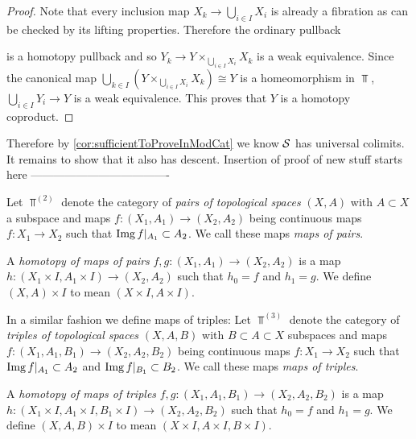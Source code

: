 \begin{lemma}
\begin{proof}
            Note that every inclusion map $X_k\to\bigcup\limits_{i\in I} X_i$ is already a fibration as can be checked by its lifting properties.
            Therefore the ordinary pullback
            \begin{center}
            \end{center}
            is a homotopy pullback and so $Y_k\to Y\times_{\bigcup\limits_{i\in I} X_i}X_k$ is a weak equivalence.
            Since the canonical map $\bigcup\limits_{k\in I}\left(Y\times_{\bigcup\limits_{i\in I} X_i}X_k\right)\cong Y$ is a homeomorphism in $\Top$, $\bigcup\limits_{i\in I}Y_i\to Y$ is a weak equivalence.
            This proves that $Y$ is a homotopy coproduct.
    \end{proof}
\end{lemma}
Therefore by \cref{cor:sufficientToProveInModCat} we know $\mathcal{S}$ has universal colimits.
It remains to show that it also has descent.
Insertion of proof of new stuff starts here -------------------------------------
\begin{definition}
    Let $\Top^{(2)}$ denote the category of \emph{pairs of topological spaces} $(X,A)$ with $A\subset X$ a subspace and maps $f\colon(X_1,A_1)\to (X_2,A_2)$ being continuous maps $f\colon X_1\to X_2$ such that $\operatorname{Img} f|_{A_1}\subset A_2$.
    We call these maps \emph{maps of pairs}.
    
    A \emph{homotopy of maps of pairs} $f,g\colon(X_1,A_1)\to (X_2,A_2)$ is a map $h\colon(X_1\times I,A_1\times I)\to (X_2,A_2)$ such that $h_0=f$ and $h_1=g$.
    We define $(X,A)\times I$ to mean $(X\times I,A\times I)$.

    In a similar fashion we define maps of triples:
    Let $\Top^{(3)}$ denote the category of \emph{triples of topological spaces} $(X,A,B)$ with $B\subset A\subset X$ subspaces and maps $f\colon(X_1,A_1,B_1)\to (X_2,A_2,B_2)$ being continuous maps $f\colon X_1\to X_2$ such that $\operatorname{Img} f|_{A_1}\subset A_2$ and $\operatorname{Img} f|_{B_1}\subset B_2$.
    We call these maps \emph{maps of triples}.
    
    A \emph{homotopy of maps of triples} $f,g\colon(X_1,A_1,B_1)\to (X_2,A_2,B_2)$ is a map $h\colon(X_1\times I,A_1\times I,B_1\times I)\to (X_2,A_2,B_2)$ such that $h_0=f$ and $h_1=g$.
    We define $(X,A,B)\times I$ to mean $(X\times I,A\times I, B\times I)$.
\end{definition}
